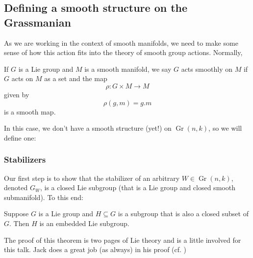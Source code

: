 \documentclass[12pt]{article}
\DeclareMathOperator{\Gr}{Gr}
\begin{document}
\subsection{Defining a smooth structure on the Grassmanian}
As we are working in the context of smooth manifolds, we need to make some sense of how this action fits into the theory of smooth group actions.
Normally,
\begin{defn}
	If $G$ is a Lie group and $M$ is a smooth manifold, we say $G$ acts smoothly on $M$ if $G$ acts on $M$ as a set and the map 
	\[\rho:G\times M\to M\]
	given by 
	\[\rho(g,m)=g.m\]
	is a smooth map.
\end{defn}
In this case, we don't have a smooth structure (yet!) on $\Gr(n,k)$, so we will define one:

\subsubsection{Stabilizers}
Our first step is to show that the stabilizer of an arbitrary $W\in\Gr(n,k)$, denoted $G_W$, is a closed Lie subgroup (that is a Lie group and closed smooth submanifold). 
To this end:
\begin{thm}\label{thm-closed-subgroup}
	Suppose $G$ is a Lie group and $H\subseteq G$ is a subgroup that is also a closed subset of $G$. Then $H$ is an embedded 
	Lie subgroup.
\end{thm}
\begin{rmk}
	The proof of this theorem is two pages of Lie theory and is a little involved for this talk. Jack does 
	a great job (as always) in his proof (cf. \cite[Thm. 20.12]{LeeISM})
\end{rmk}
\end{document}
